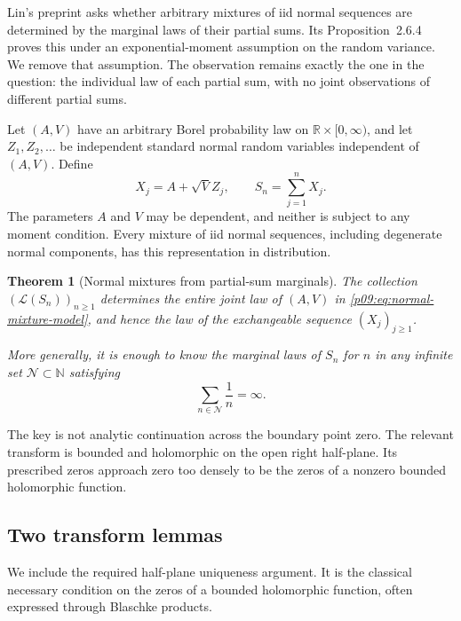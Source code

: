\documentclass[11pt,letterpaper]{article}
\newtheorem{theorem}{Theorem}[section]
\theoremstyle{definition}
\theoremstyle{remark}
\newcommand{\1}{\mathbf 1}
\begin{document}
Lin's preprint \cite[Section~2.6]{Lin2015} asks whether arbitrary
mixtures of iid normal sequences are determined by the marginal laws
of their partial sums. Its Proposition~2.6.4 proves this under an
exponential-moment assumption on the random variance. We remove that
assumption. The observation remains exactly the one in the question:
the individual law of each partial sum, with no joint observations of
different partial sums.

Let $(A,V)$ have an arbitrary Borel probability law on
$\mathbb R\times[0,\infty)$, and let $Z_1,Z_2,\ldots$ be independent
standard normal random variables independent of $(A,V)$. Define
\begin{equation}\label{p09:eq:normal-mixture-model}
       X_j=A+\sqrt V Z_j,\qquad S_n=\sum_{j=1}^nX_j.
\end{equation}
The parameters $A$ and $V$ may be dependent, and neither is subject to
any moment condition. Every mixture of iid normal sequences, including
degenerate normal components, has this representation in distribution.

\begin{theorem}[Normal mixtures from partial-sum marginals]
\label{p09:thm:normal-no-moments}
The collection $(\mathcal L(S_n))_{n\geq1}$ determines the entire
joint law of $(A,V)$ in \eqref{p09:eq:normal-mixture-model}, and hence the
law of the exchangeable sequence $(X_j)_{j\geq1}$.

More generally, it is enough to know the marginal laws of $S_n$ for
$n$ in any infinite set $\mathcal N\subset\mathbb N$ satisfying
\begin{equation}\label{p09:eq:normal-sparse-condition}
                  \sum_{n\in\mathcal N}\frac1n=\infty.
\end{equation}
\end{theorem}

The key is not analytic continuation across the boundary point zero.
The relevant transform is bounded and holomorphic on the open right
half-plane. Its prescribed zeros approach zero too densely to be the
zeros of a nonzero bounded holomorphic function.

\subsection{Two transform lemmas}

We include the required half-plane uniqueness argument. It is the
classical necessary condition on the zeros of a bounded holomorphic
function, often expressed through Blaschke products.
\end{document}
